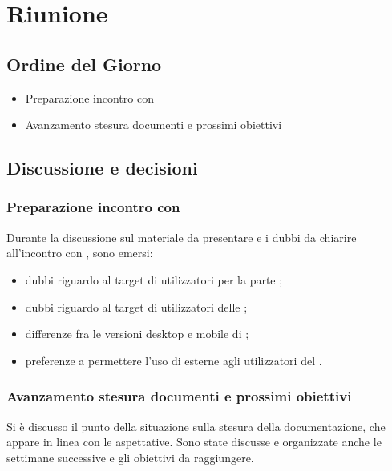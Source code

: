 \section{Riunione}
\subsection{Ordine del Giorno}
\begin{itemize}
	\item Preparazione incontro con \Proponente{}
	\item Avanzamento stesura documenti e prossimi obiettivi
\end{itemize}

\subsection{Discussione e decisioni}
\subsubsection{Preparazione incontro con \Proponente}
Durante la discussione sul materiale da presentare e i dubbi da chiarire all'incontro con \Proponente{}, sono emersi:
\begin{itemize}
	\item dubbi riguardo al target di utilizzatori per la parte ;
	\item dubbi riguardo al target di utilizzatori delle ;
	\item differenze fra le versioni desktop e mobile di ;
	\item preferenze a permettere l'uso di  esterne agli utilizzatori del .
\end{itemize}

\subsubsection{Avanzamento stesura documenti e prossimi obiettivi}
Si è discusso il punto della situazione sulla stesura della documentazione, che appare in linea con le aspettative.
Sono state discusse e organizzate anche le settimane successive e gli obiettivi da raggiungere.


\clearpage
